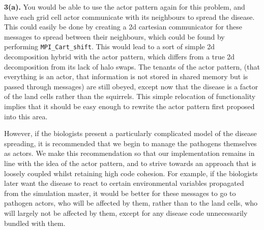 \documentclass[conference]{IEEEtran}
\begin{document}
\noindent\textbf{3(a).} \newline
You would be able to use the actor pattern again for this problem, and have each grid cell actor communicate with its neighbours to spread the disease. This could easily be done by creating a 2d cartesian communicator for these messages to spread between their neighbours, which could be found by performing \texttt{MPI\_Cart\_shift}. This would lead to a sort of simple 2d decomposition hybrid with the actor pattern, which differs from a true 2d decomposition from its lack of halo swaps. The tenants of the actor pattern, (that everything is an actor, that information is not stored in shared memory but is passed through messages) are still obeyed, except now that the disease is a factor of the land cells rather than the squirrels. This simple relocation of functionality implies that it should be easy enough to rewrite the actor pattern first proposed into this area.

However, if the biologists present a particularly complicated model of the disease spreading, it is recommended that we begin to manage the pathogens themselves as actors. We make this recommendation so that our implementation remains in line with the idea of the actor pattern, and to strive towards an approach that is loosely coupled whilst retaining high code cohesion. For example, if the biologists later want the disease to react to certain environmental variables propagated from the simulation master, it would be better for these messages to go to pathogen actors, who will be affected by them, rather than to the land cells, who will largely not be affected by them, except for any disease code unnecessarily bundled with them.
\end{document}
